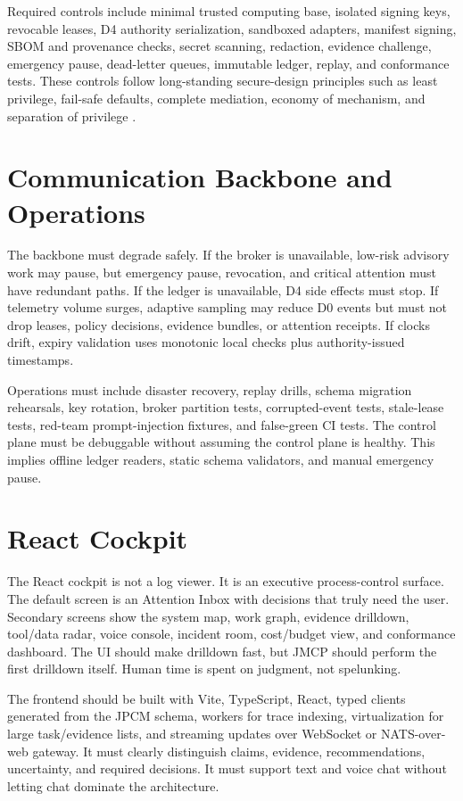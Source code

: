 \documentclass[journal,onecolumn]{IEEEtran}
\begin{document}
Required controls include minimal trusted computing base, isolated signing keys, revocable leases, D4 authority serialization, sandboxed adapters, manifest signing, SBOM and provenance checks, secret scanning, redaction, evidence challenge, emergency pause, dead-letter queues, immutable ledger, replay, and conformance tests. These controls follow long-standing secure-design principles such as least privilege, fail-safe defaults, complete mediation, economy of mechanism, and separation of privilege \cite{saltzer}.

\section{Communication Backbone and Operations}
The backbone must degrade safely. If the broker is unavailable, low-risk advisory work may pause, but emergency pause, revocation, and critical attention must have redundant paths. If the ledger is unavailable, D4 side effects must stop. If telemetry volume surges, adaptive sampling may reduce D0 events but must not drop leases, policy decisions, evidence bundles, or attention receipts. If clocks drift, expiry validation uses monotonic local checks plus authority-issued timestamps.

Operations must include disaster recovery, replay drills, schema migration rehearsals, key rotation, broker partition tests, corrupted-event tests, stale-lease tests, red-team prompt-injection fixtures, and false-green CI tests. The control plane must be debuggable without assuming the control plane is healthy. This implies offline ledger readers, static schema validators, and manual emergency pause.

\section{React Cockpit}
The React cockpit is not a log viewer. It is an executive process-control surface. The default screen is an Attention Inbox with decisions that truly need the user. Secondary screens show the system map, work graph, evidence drilldown, tool/data radar, voice console, incident room, cost/budget view, and conformance dashboard. The UI should make drilldown fast, but JMCP should perform the first drilldown itself. Human time is spent on judgment, not spelunking.

The frontend should be built with Vite, TypeScript, React, typed clients generated from the JPCM schema, workers for trace indexing, virtualization for large task/evidence lists, and streaming updates over WebSocket or NATS-over-web gateway. It must clearly distinguish claims, evidence, recommendations, uncertainty, and required decisions. It must support text and voice chat without letting chat dominate the architecture.
\end{document}
